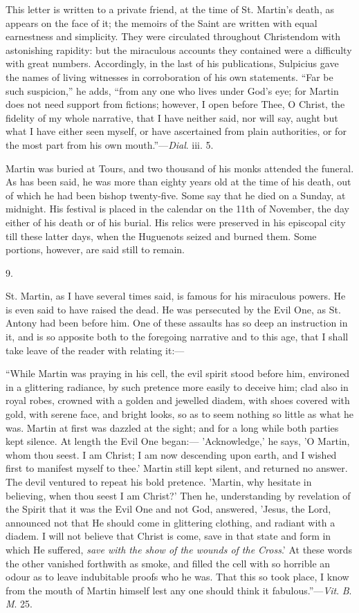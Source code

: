 This letter is written to a private friend, at the time of St.
Martin's death, as appears on the face of it; the memoirs of the Saint
are written with equal earnestness and simplicity. They were
circulated throughout Christendom with astonishing rapidity: but the
miraculous accounts they contained were a difficulty with great
numbers. Accordingly, in the last of his publications, Sulpicius gave
the names of living witnesses in corroboration of his own
statements. ``Far be such suspicion,'' he adds, ``from any
one who lives under God's eye; for Martin does not need support from
fictions; however, I open before Thee, O Christ, the fidelity of my
whole narrative, that I have neither said, nor will say, aught but
what I have either seen myself, or have ascertained from plain
authorities, or for the most part from his own mouth.''—\emph{Dial}.
iii. 5.

Martin was buried at Tours, and two thousand of his monks attended
the funeral. As has been said, he was more than eighty years old at
the time of his death, out of which he had been bishop twenty-five.
Some say that he died on a Sunday, at midnight. His festival is placed
in the calendar on the 11th of November, the day either of his death
or of his burial. His relics were preserved in his episcopal city till
these latter days, when the Huguenots seized and burned them. Some
portions, however, are said still to remain.

9.

St. Martin, as I have several times said, is famous for his
miraculous powers. He is even said to have raised the dead. He was
persecuted by the Evil One, as St. Antony had been before him. One of
these assaults has so deep an instruction in it, and is so apposite
both to the foregoing narrative and to this age, that I shall take
leave of the reader with relating it:—

``While Martin was praying in his cell, the evil spirit stood
before him, environed in a glittering radiance, by such pretence more
easily to deceive him; clad also in royal robes, crowned with a golden
and jewelled diadem, with shoes covered with gold, with serene face,
and bright looks, so as to seem nothing so little as what he was.
Martin at first was dazzled at the sight; and for a long while both
parties kept silence. At length the Evil One began:— 'Acknowledge,'
he says, 'O Martin, whom thou seest. I am Christ; I am now descending
upon earth, and I wished first to manifest myself to thee.' Martin
still kept silent, and returned no answer. The devil ventured to
repeat his bold pretence. 'Martin, why hesitate in believing, when
thou seest I am Christ?' Then he, understanding by revelation of the
Spirit that it was the Evil One and not God, answered, 'Jesus, the
Lord, announced not that He should come in glittering clothing, and
radiant with a diadem. I will not believe that Christ is come, save in
that state and form in which He suffered, \emph{save with the show of the
wounds of the Cross}.' At these words the other vanished forthwith
as smoke, and filled the cell with so horrible an odour as to leave
indubitable proofs who he was. That this so took place, I know from
the mouth of Martin himself lest any one should think it
fabulous.''—\emph{Vit}. \emph{B}. \emph{M}. 25.

